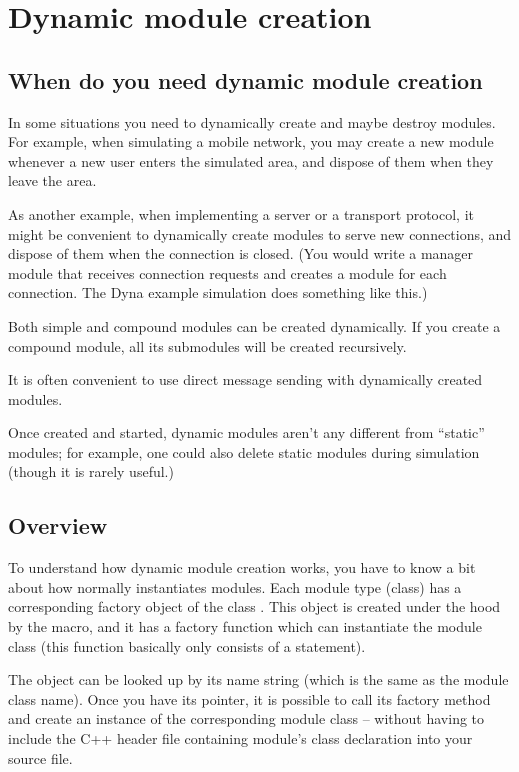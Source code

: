 \section{Dynamic module creation}
\label{sec:simple-modules:dynamic-module-creation}

\subsection{When do you need dynamic module creation}

In some situations you need to dynamically create and maybe destroy
modules. For example, when simulating a mobile network,
you may create a new module whenever a new user enters
the simulated area, and dispose of them when they leave the area.

As another example, when implementing a server or a transport
protocol, it might be convenient to dynamically create modules
to serve new connections, and dispose of them when the connection
is closed. (You would write a manager module that receives connection
requests and creates a module for each connection.
The Dyna example simulation does something like this.)

Both simple and compound modules can be created dynamically.
If you create a compound module, all its submodules will be created
recursively.

It is often convenient to use direct message sending with dynamically
created modules.

Once created and started, dynamic modules aren't any different from
``static'' modules; for example, one could also delete static modules
during simulation (though it is rarely useful.)


\subsection{Overview}


To understand how dynamic module creation works, you have to know a
bit about how normally {\opp} instantiates modules. Each module type
(class) has a corresponding factory object of the class
. This object is created under the hood by the
 macro, and it has a factory
function which can instantiate the module
class (this function basically only consists of a  statement).

The  object can be looked up by its name
string (which is the same as the module class name). Once you have its
pointer, it is possible to call its factory method and create an
instance of the corresponding module class -- without having to
include the C++ header file containing module's class declaration
into your source file.

